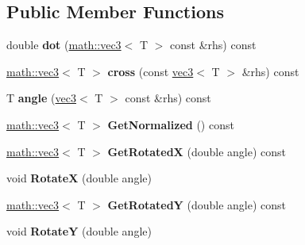 \subsection*{Public Member Functions}
\begin{DoxyCompactItemize}
\item 
\hypertarget{classmath_1_1vec3_aefe52aac96775f53d657791022048657}{
double {\bfseries dot} (\hyperlink{classmath_1_1vec3}{math::vec3}$<$ T $>$ const \&rhs) const }
\label{classmath_1_1vec3_aefe52aac96775f53d657791022048657}

\item 
\hypertarget{classmath_1_1vec3_a3690718d39b1e8f0a8343137b23c4cfe}{
\hyperlink{classmath_1_1vec3}{math::vec3}$<$ T $>$ {\bfseries cross} (const \hyperlink{classmath_1_1vec3}{vec3}$<$ T $>$ \&rhs) const }
\label{classmath_1_1vec3_a3690718d39b1e8f0a8343137b23c4cfe}

\item 
\hypertarget{classmath_1_1vec3_a57e9cdf743e97f6256aa72af644c3543}{
T {\bfseries angle} (\hyperlink{classmath_1_1vec3}{vec3}$<$ T $>$ const \&rhs) const }
\label{classmath_1_1vec3_a57e9cdf743e97f6256aa72af644c3543}

\item 
\hypertarget{classmath_1_1vec3_ad943b48e270a599e86a8438c74b982ec}{
\hyperlink{classmath_1_1vec3}{math::vec3}$<$ T $>$ {\bfseries GetNormalized} () const }
\label{classmath_1_1vec3_ad943b48e270a599e86a8438c74b982ec}

\item 
\hypertarget{classmath_1_1vec3_ac8c3afa853d432be6057d19e7d80505d}{
\hyperlink{classmath_1_1vec3}{math::vec3}$<$ T $>$ {\bfseries GetRotatedX} (double angle) const }
\label{classmath_1_1vec3_ac8c3afa853d432be6057d19e7d80505d}

\item 
\hypertarget{classmath_1_1vec3_a3f44607ec66f38a42e357cedaff4838e}{
void {\bfseries RotateX} (double angle)}
\label{classmath_1_1vec3_a3f44607ec66f38a42e357cedaff4838e}

\item 
\hypertarget{classmath_1_1vec3_ac38729bb7d1a37203b805abe30b6aded}{
\hyperlink{classmath_1_1vec3}{math::vec3}$<$ T $>$ {\bfseries GetRotatedY} (double angle) const }
\label{classmath_1_1vec3_ac38729bb7d1a37203b805abe30b6aded}

\item 
\hypertarget{classmath_1_1vec3_a2da382572748410a8b83b5a5cb81779f}{
void {\bfseries RotateY} (double angle)}
\label{classmath_1_1vec3_a2da382572748410a8b83b5a5cb81779f}


\end{DoxyCompactItemize}
